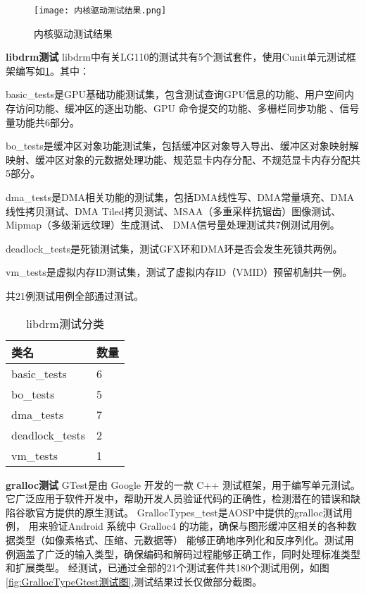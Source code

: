 \begin{figure}[h]
    \centering
    \texttt{[image: 内核驱动测试结果.png]}
    \caption{内核驱动测试结果}
    \label{fig:内核驱动测试结果}
\end{figure}

\textbf{libdrm测试}
libdrm中有关LG110的测试共有5个测试套件，使用Cunit单元测试框架编写如\ref{tab:libdrm测试分类}。其中：

basic\_tests是GPU基础功能测试集，包含测试查询GPU信息的功能、用户空间内存访问功能、缓冲区的逐出功能、GPU 命令提交的功能、多栅栏同步功能 、信号量功能共6部分。

bo\_tests是缓冲区对象功能测试集，包括缓冲区对象导入导出、缓冲区对象映射解映射、缓冲区对象的元数据处理功能、规范显卡内存分配、不规范显卡内存分配共5部分。

dma\_tests是DMA相关功能的测试集，包括DMA线性写、DMA常量填充、DMA线性拷贝测试、DMA Tiled拷贝测试、MSAA（多重采样抗锯齿）图像测试、Mipmap（多级渐远纹理）生成测试、
DMA信号量处理测试共7例测试用例。

deadlock\_tests是死锁测试集，测试GFX环和DMA环是否会发生死锁共两例。

vm\_tests是虚拟内存ID测试集，测试了虚拟内存ID（VMID）预留机制共一例。

共21例测试用例全部通过测试。

\begin{table}[h]
    \centering
    \caption{libdrm测试分类}
    \label{tab:libdrm测试分类}
    \begin{tabular}{ll}
      \toprule
      类名   &  数量  \\
      \midrule
      basic\_tests & 6 \\
      bo\_tests & 5 \\
      dma\_tests & 7 \\
      deadlock\_tests & 2 \\
      vm\_tests & 1 \\
      \bottomrule
    \end{tabular}
    \note{}
\end{table}

\textbf{gralloc测试}
GTest\cite{GoogleTest}是由 Google 开发的一款 C++ 测试框架，用于编写单元测试。它广泛应用于软件开发中，帮助开发人员验证代码的正确性，检测潜在的错误和缺陷谷歌官方提供的原生测试。
GrallocTypes\_test是AOSP中提供的gralloc测试用例， 用来验证Android 系统中 Gralloc4 的功能，确保与图形缓冲区相关的各种数据类型（如像素格式、压缩、元数据等）
能够正确地序列化和反序列化。测试用例涵盖了广泛的输入类型，确保编码和解码过程能够正确工作，同时处理标准类型和扩展类型。
经测试，已通过全部的21个测试套件共180个测试用例，如图\ref{fig:GrallocTypeGtest测试图},测试结果过长仅做部分截图。

